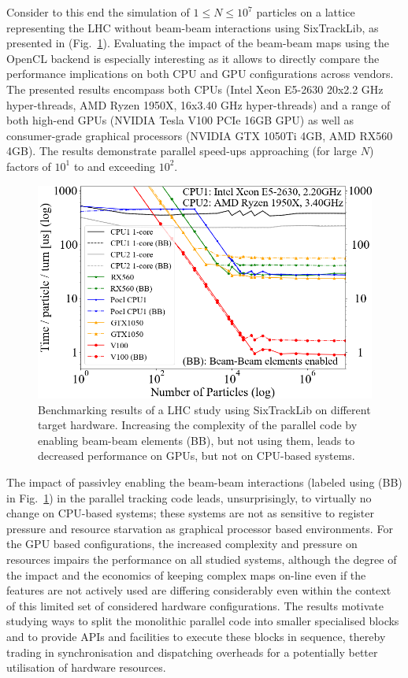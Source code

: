 \documentclass[a4paper,
              ]{jacow}
\begin{document}
Consider to this end the simulation of $1 \leq N \leq 10^7$ particles on a lattice representing the LHC without beam-beam interactions using SixTrackLib, as presented in (Fig.~\ref{fig:sixtracklib_results}). 
Evaluating the impact of the beam-beam maps using the OpenCL backend is especially interesting as it allows to directly compare the performance implications on both CPU and GPU configurations across vendors. 
The presented results encompass both CPUs (Intel Xeon E5-2630 20x2.2 GHz hyper-threads, AMD Ryzen 1950X, 16x3.40 GHz hyper-threads) and a range of both high-end GPUs (NVIDIA Tesla V100 PCIe 16GB GPU) as well as 
consumer-grade graphical processors (NVIDIA GTX 1050Ti 4GB, AMD RX560 4GB). The results demonstrate parallel speed-ups approaching (for large $N$) factors of $10^1$ to and exceeding $10^2$. 
\begin{figure}[htb]
 \centering
 \includegraphics[width=\columnwidth]{devices_times_per_particle_and_turn.png}
 \caption{Benchmarking results of a LHC study using SixTrackLib on different target hardware. Increasing the complexity of the parallel code by enabling beam-beam elements (BB), but not using them, leads to decreased performance on GPUs, but not on CPU-based systems.}
 \label{fig:sixtracklib_results}
\end{figure}

The impact of passivley enabling the beam-beam interactions (labeled using (BB) in Fig.~\ref{fig:sixtracklib_results}) in the parallel tracking code leads, unsurprisingly, to virtually no change on CPU-based systems; these systems are not as sensitive to register pressure and resource starvation as graphical processor based environments. 
For the GPU based configurations, the increased complexity and pressure on resources impairs the performance on all studied systems, although the degree of the impact and the economics of keeping complex maps on-line even if the features are not actively used
are differing considerably even within the context of this limited set of considered hardware configurations. The results motivate studying ways to split the monolithic parallel code into smaller specialised blocks and to provide APIs and facilities to execute these blocks in sequence, thereby trading in synchronisation and dispatching overheads for a potentially better utilisation of hardware resources.
\end{document}
